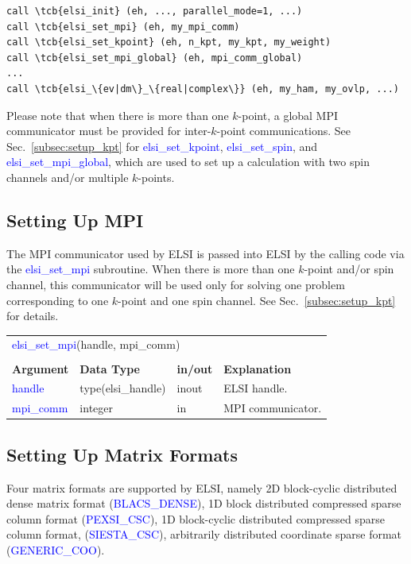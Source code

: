 \documentclass{report}
\newcommand{\tcb}[1]{\textcolor{blue}{#1}}
\begin{document}
\begin{tcolorbox}
\begin{Verbatim}[commandchars=\\\{\}]
call \tcb{elsi_init} (eh, ..., parallel_mode=1, ...)
call \tcb{elsi_set_mpi} (eh, my_mpi_comm)
call \tcb{elsi_set_kpoint} (eh, n_kpt, my_kpt, my_weight)
call \tcb{elsi_set_mpi_global} (eh, mpi_comm_global)
...
call \tcb{elsi_\{ev|dm\}_\{real|complex\}} (eh, my_ham, my_ovlp, ...)
\end{Verbatim}
\end{tcolorbox}

Please note that when there is more than one $k$-point, a global MPI communicator must be provided for inter-$k$-point communications. See Sec.~\ref{subsec:setup_kpt} for \tcb{elsi\_set\_kpoint}, \tcb{elsi\_set\_spin}, and \tcb{elsi\_set\_mpi\_global}, which are used to set up a calculation with two spin channels and/or multiple $k$-points.

\subsection{Setting Up MPI}
\label{subsec:setup_mpi}
The MPI communicator used by ELSI is passed into ELSI by the calling code via the \tcb{elsi\_set\_mpi} subroutine. When there is more than one $k$-point and/or spin channel, this communicator will be used only for solving one problem corresponding to one $k$-point and one spin channel. See Sec.~\ref{subsec:setup_kpt} for details.

\begin{tabular}[]{|p{30mm}|p{30mm}|p{15mm}|p{90mm}|}
\multicolumn{4}{l}{\tcb{elsi\_set\_mpi}(handle, mpi\_comm)}\\
\multicolumn{4}{l}{}\\
\hline
\multicolumn{1}{|l|}{\textbf{Argument}} & \multicolumn{1}{l|}{\textbf{Data Type}} & \multicolumn{1}{l|}{\textbf{in/out}} & \multicolumn{1}{l|}{\textbf{Explanation}}\\
\hline
\tcb{handle}    & type(elsi\_handle) & inout & ELSI handle.\\
\hline
\tcb{mpi\_comm} & integer            & in    & MPI communicator.\\
\hline
\end{tabular}

\subsection{Setting Up Matrix Formats}
\label{subsec:setup_matrix}
Four matrix formats are supported by ELSI, namely 2D block-cyclic distributed dense matrix format (\tcb{BLACS\_DENSE}), 1D block distributed compressed sparse column format (\tcb{PEXSI\_CSC}), 1D block-cyclic distributed compressed sparse column format, (\tcb{SIESTA\_CSC}), arbitrarily distributed coordinate sparse format (\tcb{GENERIC\_COO}).
\end{document}
